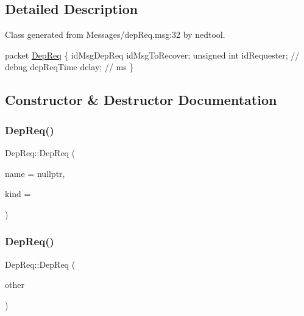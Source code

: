 \subsection{Detailed Description}
Class generated from {\ttfamily Messages/dep\+Req.\+msg\+:32} by nedtool. 


\begin{DoxyPre}
packet \hyperlink{class_dep_req}{DepReq}
\{
    idMsgDepReq idMsgToRecover;
    unsigned int idRequester; // debug
    depReqTime delay; // ms 
\}
\end{DoxyPre}
 

\subsection{Constructor \& Destructor Documentation}
\mbox{\label{class_dep_req_a133b51d43699e8ebecccf069935d93c4}} 
\subsubsection{\texorpdfstring{Dep\+Req()}{DepReq()}\hspace{0.1cm}{\footnotesize\ttfamily [1/2]}}
{\footnotesize\ttfamily Dep\+Req\+::\+Dep\+Req (\begin{DoxyParamCaption}\item[{const char $\ast$}]{name = {\ttfamily nullptr},  }\item[{short}]{kind = {} }\end{DoxyParamCaption})}

\mbox{\label{class_dep_req_adf6800c87693c1de5b88d89c577186b8}} 
\subsubsection{\texorpdfstring{Dep\+Req()}{DepReq()}\hspace{0.1cm}{\footnotesize\ttfamily [2/2]}}
{\footnotesize\ttfamily Dep\+Req\+::\+Dep\+Req (\begin{DoxyParamCaption}\item[{const \hyperlink{class_dep_req}{Dep\+Req} \&}]{other }\end{DoxyParamCaption})}

\mbox{\label{class_dep_req_a6f770d0327bf43dcef5f6a58f5a32183}} 
